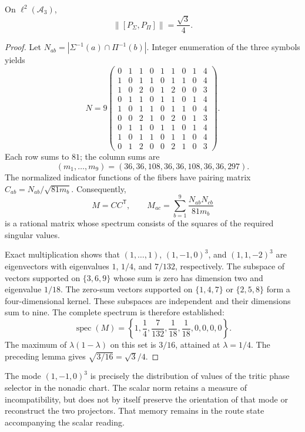 \begin{proposition}
On \(\ell^2(\mathcal A_3)\),
\begin{equation}
 \|[P_\Sigma,P_\Pi]\|=\frac{\sqrt3}{4}.
 \label{ivloc:norma}
\end{equation}
\end{proposition}
\begin{proof}
Let \(N_{ab}=|\Sigma^{-1}(a)\cap\Pi^{-1}(b)|\). Integer enumeration
of the three symbols yields
\[
 N=9\begin{pmatrix}
 0&1&1&0&1&1&0&1&4\\
 1&0&1&1&0&1&1&0&4\\
 1&0&2&0&1&2&0&0&3\\
 0&1&1&0&1&1&0&1&4\\
 1&0&1&1&0&1&1&0&4\\
 0&0&2&1&0&2&0&1&3\\
 0&1&1&0&1&1&0&1&4\\
 1&0&1&1&0&1&1&0&4\\
 0&1&2&0&0&2&1&0&3
 \end{pmatrix}.
\]
Each row sums to \(81\); the column sums are
\[
 (m_1,\ldots,m_9)=(36,36,108,36,36,108,36,36,297).
\]
The normalized indicator functions of the fibers have pairing
matrix \(C_{ab}=N_{ab}/\sqrt{81m_b}\). Consequently,
\[
 M=CC^{\mathsf T},\qquad
 M_{ac}=\sum_{b=1}^9\frac{N_{ab}N_{cb}}{81m_b}
\]
is a rational matrix whose spectrum consists of the squares of the
required singular values.

Exact multiplication shows that \((1,\ldots,1)\),
\((1,-1,0)^3\), and \((1,1,-2)^3\) are eigenvectors with eigenvalues
\(1\), \(1/4\), and \(7/132\), respectively. The subspace of
vectors supported on \(\{3,6,9\}\) whose sum is zero has dimension
two and eigenvalue \(1/18\). The zero-sum vectors supported on
\(\{1,4,7\}\) or \(\{2,5,8\}\) form a four-dimensional
kernel. These subspaces are independent and their dimensions sum to
nine. The complete spectrum is therefore established:
\[
 \operatorname{spec}(M)=
 \left\{1,\frac14,\frac7{132},\frac1{18},\frac1{18},0,0,0,0\right\}.
\]
The maximum of \(\lambda(1-\lambda)\) on this set is \(3/16\),
attained at \(\lambda=1/4\). The preceding lemma gives
\(\sqrt{3/16}=\sqrt3/4\).
\end{proof}

The mode \((1,-1,0)^3\) is precisely the distribution of values of the
tritic phase selector in the nonadic chart. The scalar norm retains
a measure of incompatibility, but does not by itself preserve the
orientation of that mode or reconstruct the two projectors. That memory
remains in the route state accompanying the scalar reading.

